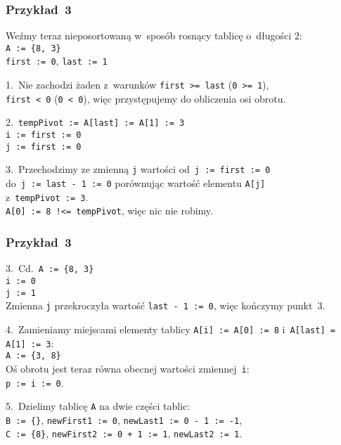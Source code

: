 \documentclass[10pt,t]{beamer}
\begin{document}
\begin{frame}
  \frametitle{Przykład~3}


  Weźmy teraz nieposortowaną w~sposób rosnący tablicę o~długości $2$: \\
  \texttt{A := \{8, 3\} } \\
  \texttt{first := 0}, \texttt{last := 1}

  1.~Nie zachodzi żaden z~warunków \texttt{first >= last}
  (\texttt{0 >= 1}), \\
  \texttt{first < 0} (\texttt{0 < 0}), więc przystępujemy do obliczenia osi
  obrotu.

  2.~\texttt{tempPivot := A[last] := A[1] := 3} \\
  \texttt{i := first := 0} \\
  \texttt{j := first := 0}

  3.~Przechodzimy ze zmienną \texttt{j} wartości
  od~\texttt{j := first := 0} \\
  do~\texttt{j := last - 1 := 0} porównując wartość elementu
  \texttt{A[j]} \\
  z~\texttt{tempPivot := 3}. \\
  \texttt{A[0] := 8 !<= tempPivot}, więc nic nie robimy.

\end{frame}





\begin{frame}
  \frametitle{Przykład~3}


  3.~Cd.~\texttt{A := \{8, 3\} } \\
  \texttt{i := 0} \\
  \texttt{j := 1} \\
  Zmienna \texttt{j} przekroczyła wartość \texttt{last - 1 := 0}, więc
  kończymy punkt~$3$.

  4.~Zamieniamy miejscami elementy tablicy \texttt{A[i] := A[0] := 8}
  i~\texttt{A[last] = A[1] := 3}: \\
  \texttt{A := \{3, 8\} } \\
  Oś obrotu jest teraz równa obecnej wartości zmiennej~\texttt{i}: \\
  \texttt{p := i := 0}.

  5.~Dzielimy tablicę \texttt{A} na dwie części tablic: \\
  \texttt{B := \{\}}, \texttt{newFirst1 := 0},
  \texttt{newLast1 := 0 - 1 := -1}, \\
  \texttt{C := \{8\}}, \texttt{newFirst2 := 0 + 1 := 1},
  \texttt{newLast2 := 1}.


\end{frame}
\end{document}
